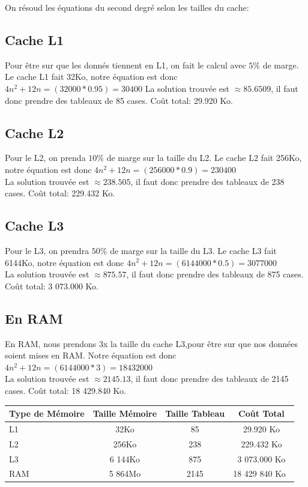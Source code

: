 \documentclass[a4paper]{report}
\begin{document}
On résoud les équations du second degré selon les tailles du cache:\\

\subsection*{Cache L1}
Pour être sur que les donnés tiennent en L1, on fait le calcul avec $5\%$ de marge.
Le cache L1 fait 32Ko, notre équation est donc $4n^2+12n=(32 000*0.95)=30 400$
La solution trouvée est $\approx 85.6509$, il faut donc prendre des tableaux de 85 cases. Coût total: 29.920 Ko.\\

\subsection*{Cache L2}
Pour le L2, on prenda $10\%$ de marge sur la taille du L2.
Le cache L2 fait 256Ko, notre équation est donc $4n^2+12n=(256 000*0.9)=230 400$\\
La solution trouvée est $\approx 238.505$, il faut donc prendre des tableaux de 238 cases. Coût total: 229.432 Ko.\\

\subsection*{Cache L3}
Pour le L3, on prendra $50\%$ de marge sur la taille du L3.
Le cache L3 fait 6144Ko, notre équation est donc $4n^2+12n=(6 144 000*0.5)= 3 077 000$\\
La solution trouvée est $\approx 875.57$, il faut donc prendre des tableaux de 875 cases. Coût total: 3 073.000 Ko.\\

\subsection*{En RAM}
En RAM, nous prendons 3x la taille du cache L3,pour être sur que nos données soient mises en RAM.
Notre équation est donc $4n^2+12n=(6 144 000*3)=18 432 000$\\
La solution trouvée est $\approx 2145.13$, il faut donc prendre des tableaux de 2145 cases. Coût total: 18 429.840 Ko.\\

\begin{tabular}{ l c | c c }
    Type de Mémoire & Taille Mémoire & Taille Tableau & Coût Total\\\hline
    L1 & 32Ko & 85 & 29.920 Ko\\ 
    L2 & 256Ko & 238 & 229.432 Ko \\
    L3 & 6 144Ko & 875 & 3 073.000 Ko \\
    RAM & 5 864Mo & 2145 & 18 429 840 Ko \\
\end{tabular}
\end{document}
